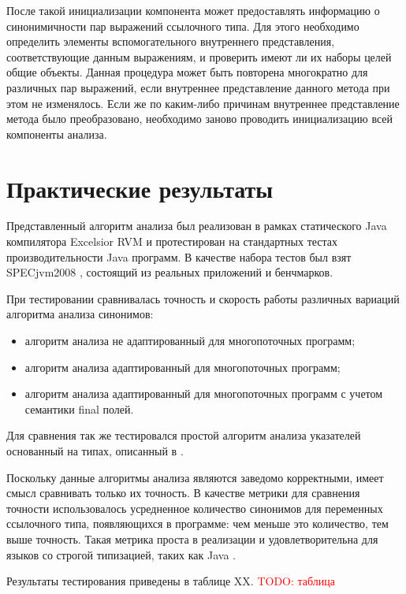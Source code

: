 \documentclass[14pt,titlepage]{extarticle}
\newcommand{\todo}[1]{\textcolor{red}{\eng{TODO}: #1}}
\newcommand{\eng}[1]{{\English#1}}
\let\oldsection\section
\renewcommand{\section}{\newpage\oldsection}
\begin{document}
      После такой инициализации компонента может предоставлять информацию о
      синонимичности пар выражений ссылочного типа. Для этого необходимо
      определить элементы вспомогательного внутреннего представления,
      соответствующие данным выражениям, и проверить имеют ли их наборы целей
      общие объекты. Данная процедура может быть повторена многократно для
      различных пар выражений, если внутреннее представление данного метода при
      этом не изменялось. Если же по каким-либо причинам внутреннее
      представление метода было преобразовано, необходимо заново проводить
      инициализацию всей компоненты анализа.

  \section{Практические результаты}

    Представленный алгоритм анализа был реализован в рамках статического
    Java компилятора Excelsior RVM и протестирован на стандартных тестах
    производительности Java программ.
    В качестве набора тестов был взят SPECjvm2008 \cite{spec_jvm}, состоящий из
    реальных приложений и бенчмарков.

    При тестировании сравнивалась точность и скорость работы различных вариаций
    алгоритма анализа синонимов:
    \begin{itemize}
      \item алгоритм анализа не адаптированный для многопоточных программ;
      \item алгоритм анализа адаптированный для многопоточных программ;
      \item алгоритм анализа адаптированный для многопоточных программ с
            учетом семантики final полей.
    \end{itemize}
    Для сравнения так же тестировался простой алгоритм анализа указателей
    основанный на типах, описанный в \cite{diwan_tbaa}.

    Поскольку данные алгоритмы анализа являются заведомо корректными, имеет
    смысл сравнивать только их точность. В качестве метрики для сравнения
    точности использовалось усредненное количество синонимов для переменных
    ссылочного типа, появляющихся в программе: чем меньше это количество, тем
    выше точность. Такая метрика проста в реализации и удовлетворительна для
    языков со строгой типизацией, таких как Java
    \cite{hind_pointer_analysis_not_solved_yet}.

    Результаты тестирования приведены в таблице XX.
    \todo{таблица}
\end{document}
